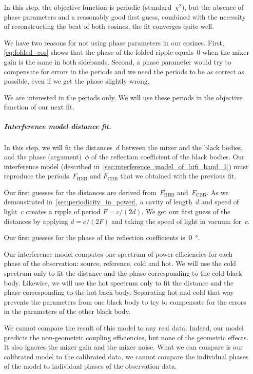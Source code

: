 In this step, the objective function is periodic (standard~$\chi^2$), but the absence of phase parameters and a reasonably good first guess, combined with the necessity of reconstructing the beat of both cosines, the fit converges quite well.

We have two reasons for not using phase parameters in our cosines.
First, \vref{eq:folded_cos} shows that the phase of the folded ripple equals~$0$ when the mixer gain is the same in both sidebands.
Second, a phase parameter would try to compensate for errors in the periods and we need the periods to be as correct as possible, even if we get the phase slightly wrong.

We are interested in the periods only.
We will use these periods in the objective function of our next fit.

\subparagraph{Interference model distance fit.}
In this step, we will fit the distances~$d$ between the mixer and the black bodies, and the phase (argument)~$\phi$ of the reflection coefficient of the black bodies.
Our interference model (described in~\cref{sec:interference_model_of_hifi_band_1}) must reproduce the periods~$F_\text{HBB}$ and $F_\text{CBB}$ that we obtained with the previous fit.

Our first guesses for the distances are derived from~$F_\text{HBB}$ and~$F_\text{CBB}$.
As we demonstrated in~\vref{sec:periodicity_in_power},
a cavity of length~$d$ and speed of light~$c$ creates a ripple of period $F=c/(2d)$.
We get our first guess of the distances by applying $d=c/(2F)$ and taking the speed of light in vacuum for~$c$.

Our first guesses for the phase of the reflection coefficients is~\SI{0}{\degree}.

Our interference model computes one spectrum of power efficiencies for each phase of the observation: source, reference, cold and hot.
We will use the cold spectrum only to fit the distance and the phase corresponding to the cold black body.
Likewise, we will use the hot spectrum only to fit the distance and the phase corresponding to the hot back body.
Separating hot and cold that way prevents the parameters from one black body to try to compensate for the errors in the parameters of the other black body.

We cannot compare the result of this model to any real data.
Indeed, our model predicts the non-geometric coupling efficiencies, but none of the geometric effects.
It also ignores the mixer gain and the mixer noise.
What we can compare is our calibrated model to the calibrated data, we cannot compare the individual phases of the model to individual phases of the observation data.

